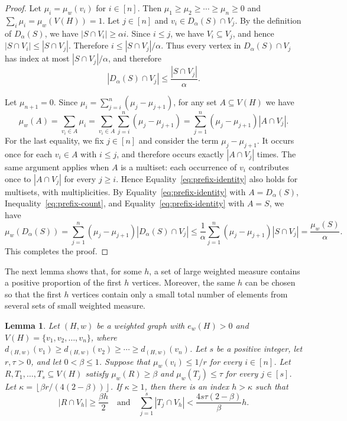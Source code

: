 \documentclass[12pt]{article}
\numberwithin{equation}{section}
\newtheorem{lemma}[theorem]{Lemma}
\theoremstyle{definition}
\begin{document}
\begin{proof}
Let $\mu_i = \mu_w(v_i)$ for $i \in [n]$. Then
$\mu_1 \geq \mu_2 \geq \cdots \geq \mu_n \geq 0$ and
$\sum_i \mu_i = \mu_w(V(H)) = 1$.
Let $j \in [n]$ and $v_i \in D_\alpha(S) \cap V_j$. By the definition of
$D_\alpha(S)$, we have $|S \cap V_i| \geq \alpha i$. Since $i \leq j$, we
have $V_i \subseteq V_j$, and hence
$|S \cap V_i| \leq |S \cap V_j|$. Therefore
$i \leq |S \cap V_j|/\alpha$. Thus every vertex in
$D_\alpha(S) \cap V_j$ has index at most $|S \cap V_j|/\alpha$, and therefore
\begin{equation}\label{eq:prefix-count}
 |D_\alpha(S) \cap V_j| \leq \frac{|S \cap V_j|}{\alpha}.
\end{equation}

Let $\mu_{n+1} = 0$. Since
$\mu_i = \sum_{j = i}^n(\mu_j - \mu_{j+1})$, for any set
$A \subseteq V(H)$ we have
\begin{equation}\label{eq:prefix-identity}
 \mu_w(A) = \sum_{v_i \in A} \mu_i
 = \sum_{v_i \in A} \sum_{j = i}^n(\mu_j - \mu_{j+1})
 = \sum_{j = 1}^n(\mu_j - \mu_{j+1})|A \cap V_j|.
\end{equation}
For the last equality, we fix $j\in[n]$ and consider the term
$\mu_j-\mu_{j+1}$. It occurs once for each $v_i\in A$ with $i\leq j$, and
therefore occurs exactly $|A\cap V_j|$ times. The same argument applies when
$A$ is a multiset: each occurrence of $v_i$ contributes once to
$|A\cap V_j|$ for every $j\geq i$. Hence
Equality~\eqref{eq:prefix-identity} also holds for multisets, with
multiplicities. By Equality~\eqref{eq:prefix-identity} with
$A = D_\alpha(S)$, Inequality~\eqref{eq:prefix-count}, and
Equality~\eqref{eq:prefix-identity} with $A = S$, we have
\[
 \mu_w(D_\alpha(S))
 = \sum_{j = 1}^n(\mu_j - \mu_{j+1})|D_\alpha(S) \cap V_j|
 \leq \frac{1}{\alpha}\sum_{j = 1}^n(\mu_j - \mu_{j+1})|S \cap V_j|
 = \frac{\mu_w(S)}{\alpha}.
\]
This completes the proof.
\end{proof}

The next lemma shows that, for some $h$, a set of large weighted measure
contains a positive proportion of the first $h$ vertices. Moreover, the same
$h$ can be chosen so that the first $h$ vertices contain only a small total
number of elements from several sets of small weighted measure.

\begin{lemma}\label{lem:initial-segment}
Let $(H,w)$ be a weighted graph with $e_w(H) > 0$ and
$V(H) = \{v_1,v_2,\ldots,v_n\}$, where
$d_{(H,w)}(v_1) \geq d_{(H,w)}(v_2) \geq \cdots
\geq d_{(H,w)}(v_n)$. Let $s$ be a positive integer, let $r,\tau > 0$, and
let $0 < \beta \leq 1$. Suppose that $\mu_w(v_i)\leq 1/r$ for every $i\in[n]$. Let
$R,T_1,\ldots,T_s \subseteq V(H)$ satisfy $\mu_w(R) \geq \beta$ and
$\mu_w(T_j) \leq \tau$ for every $j \in [s]$. Let
$\kappa = \left\lfloor\beta r/(4(2 - \beta))\right\rfloor$. If
$\kappa \geq 1$,
then there is an index
$h > \kappa$ such that
\[
 |R \cap V_h| \geq \frac{\beta h}{2}
 \quad\text{and}\quad
 \sum_{j = 1}^s |T_j \cap V_h|
 < \frac{4s\tau(2 - \beta)}{\beta}h.
\]
\end{lemma}
\end{document}
